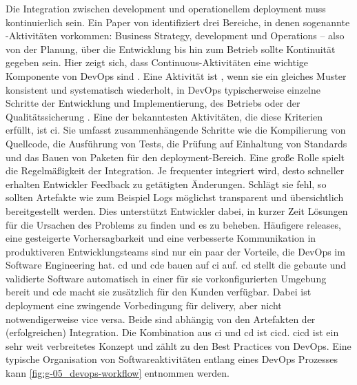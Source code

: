 Die Integration zwischen \Gls{development} und operationellem \Gls{deployment} muss kontinuierlich sein. Ein Paper von \citeauthor{005:Continous-Software-Engineering-and-Beyond} identifiziert drei Bereiche, in denen sogenannte -Aktivitäten vorkommen: Business Strategy, \Gls{development} und Operations -- also von der Planung, über die Entwicklung bis hin zum Betrieb sollte Kontinuität gegeben sein. \cite{005:Continous-Software-Engineering-and-Beyond} Hier zeigt sich, dass Continuous-Aktivitäten eine wichtige Komponente von DevOps sind \cite{000:CI-CD-Deployment-in-DevOps-reduce-Gap-Developer-Operation}. Eine Aktivität ist , wenn sie ein gleiches Muster konsistent und systematisch wiederholt, in DevOps typischerweise einzelne Schritte der Entwicklung und Implementierung, des Betriebs oder der Qualitätssicherung \cite{007:Analysis-of-Declarative-and-Pull-based-Deployment-Models-on-GitOps}. Eine der bekanntesten Aktivitäten, die diese Kriterien erfüllt, ist \acrfull{ci}. Sie umfasst zusammenhängende Schritte wie die Kompilierung von Quellcode, die Ausführung von Tests, die Prüfung auf Einhaltung von Standards und das Bauen von Paketen für den \Gls{deployment}-Bereich. Eine große Rolle spielt die Regelmäßigkeit der Integration. Je frequenter integriert wird, desto schneller erhalten Entwickler Feedback zu getätigten Änderungen. Schlägt sie fehl, so sollten Artefakte wie zum Beispiel Logs möglichst transparent und übersichtlich bereitgestellt werden. Dies unterstützt Entwickler dabei, in kurzer Zeit Lösungen für die Ursachen des Problems zu finden und es zu beheben. Häufigere \Glspl{release}, eine gesteigerte Vorhersagbarkeit und eine verbesserte Kommunikation in produktiveren Entwicklungsteams sind nur ein paar der Vorteile, die DevOps im Software Engineering hat. \acrfull{cd} und \acrfull{cde} bauen auf \Gls{ci} auf. \acrshort{cd} stellt die gebaute und validierte Software automatisch in einer für sie vorkonfigurierten Umgebung bereit und \acrshort{cde} macht sie zusätzlich für den Kunden verfügbar. Dabei ist \Gls{deployment} eine zwingende Vorbedingung für \Gls{delivery}, aber nicht notwendigerweise vice versa. Beide sind abhängig von den Artefakten der (erfolgreichen) Integration. \cite{005:Continous-Software-Engineering-and-Beyond} Die Kombination aus \Gls{ci} und \Gls{cd} ist \acrfull{cicd}. \Gls{cicd} ist ein sehr weit verbreitetes Konzept und zählt zu den Best Practices von DevOps. Eine typische Organisation von Softwareaktivitäten entlang eines DevOps Prozesses kann \autoref{fig:g-05_devops-workflow} entnommen werden.

